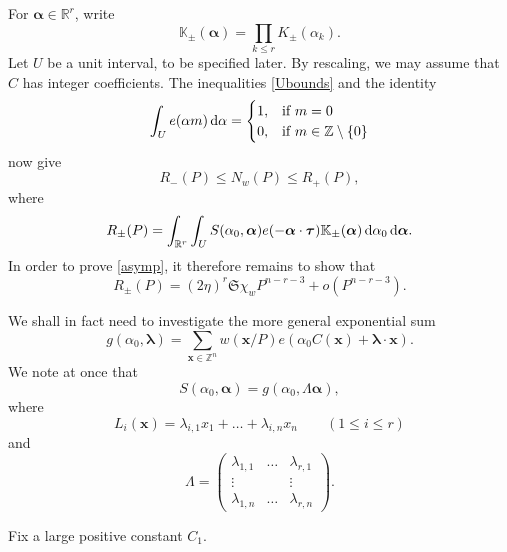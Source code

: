 \documentclass[12pt,reqno]{amsart}
\theoremstyle{definition}
\theoremstyle{remark}
\numberwithin{equation}{section}
\begin{document}
For ${\boldsymbol{{\alpha}}} \in {\mathbb R}^r$, write
\begin{equation} \label{Kprod}
{\mathbb K}_\pm({\boldsymbol{{\alpha}}}) = \prod_{k {\leqslant} r} K_\pm({{\alpha}}_k).
\end{equation}
Let $U$ be a unit interval, to be specified later. By rescaling, we may assume that $C$ has integer coefficients. The inequalities \eqref{Ubounds} and the identity
\begin{equation} \label{orth}
\int_U e({{\alpha}} m) {{\,{\rm d}}} {{\alpha}} = \begin{cases}
1, &\text{if } m = 0 \\
0, &\text{if } m \in {\mathbb Z} \setminus \{ 0 \}
\end{cases}
\end{equation}
now give
\[
R_{-}(P)  {\leqslant} N_w(P) {\leqslant} R_+(P), 
\]
where 
\[ 
R_\pm(P) = \int_{{\mathbb R}^r} \int_U S({{\alpha}}_0,{\boldsymbol{{\alpha}}}) e(-{\boldsymbol{{\alpha}}} \cdot {\boldsymbol{\tau}}) {\mathbb K}_\pm({\boldsymbol{{\alpha}}}) {{\,{\rm d}}} {{\alpha}}_0 {{\,{\rm d}}} {\boldsymbol{{\alpha}}}. 
\]
In order to prove \eqref{asymp}, it therefore remains to show that
\begin{equation} \label{goal1}
R_\pm(P) = (2 \eta)^r {\mathfrak S} \chi_w P^{n-r-3} + o(P^{n-r-3}).
\end{equation}

We shall in fact need to investigate the more general exponential sum
\[
g({{\alpha}}_0, {{\boldsymbol {{\lambda}}}}) = \sum_{{\mathbf x} \in {\mathbb Z}^n} w({\mathbf x} / P) e({{\alpha}}_0 C({\mathbf x}) + {{\boldsymbol {{\lambda}}}} \cdot {\mathbf x}).
\]
We note at once that
\[
S({{\alpha}}_0,{\boldsymbol{{\alpha}}}) = g({{\alpha}}_0, {{\Lambda}} {\boldsymbol{{\alpha}}}),
\]
where
\begin{equation} \label{lamdef}
L_i({\mathbf x}) = {{\lambda}}_{i,1} x_1 + \ldots + {{\lambda}}_{i,n} x_n \qquad (1 {\leqslant} i {\leqslant} r)
\end{equation}
and
\begin{equation} \label{LamDef}
{{\Lambda}} = \begin{pmatrix}
{{\lambda}}_{1,1} & \ldots & {{\lambda}}_{r,1} \\
\vdots &  & \vdots \\
{{\lambda}}_{1,n} & \ldots & {{\lambda}}_{r,n}
\end{pmatrix}.
\end{equation}

Fix a large positive constant $C_1$.
\end{document}
